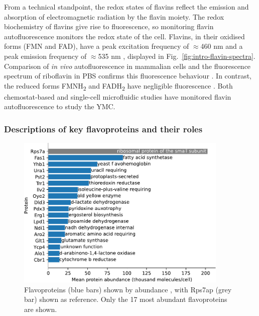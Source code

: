 From a technical standpoint, the redox states of flavins reflect the emission and absorption of electromagnetic radiation by the flavin moiety.
The redox biochemistry of flavins give rise to fluorescence, so monitoring flavin autofluorescence monitors the redox state of the cell.
Flavins, in their oxidised forms (FMN and FAD), have a peak excitation frequency of $\approx$460 nm and a peak emission frequency of $\approx$535 nm \parencite{maslankaAutofluorescenceYeastSaccharomyces2018, wagnieresVivoFluorescenceSpectroscopy1998}, displayed in Fig.\ \ref{fig:intro-flavin-spectra}.
Comparison of \textit{in vivo} autofluorescence in mammalian cells and the fluorescence spectrum of riboflavin in PBS confirms this fluorescence behaviour \parencite{aubinAutofluorescenceViableCultured1979}.
In contrast, the reduced forms FMNH\textsubscript{2} and FADH\textsubscript{2} have negligible fluorescence \parencite{mastersConfocalRedoxImaging1994}.
Both chemostat-based \parencite{sasidharanTimeStructureYeastMetabolism2012, murrayRedoxRegulationRespiring2011} and single-cell microfluidic studies \parencite{baumgartnerFlavinbasedMetabolicCycles2018} have monitored flavin autofluorescence to study the YMC\@.

\subsubsection{Descriptions of key flavoproteins and their roles}
\label{subsubsec:intro-flavin-biochem-descriptions}

\begin{figure}
  \centering
  \includegraphics[width=0.9\textwidth]{flavoprotein_abundance_bar}
  \caption[
    Flavoproteins shown by abundance
  ]{
    Flavoproteins (blue bars) shown by abundance \parencite{hoUnificationProteinAbundance2018}, with Rps7ap (grey bar) shown as reference.
    Only the 17 most abundant flavoproteins are shown.
    }
  \label{fig:intro-flavoprotein-abundance}
\end{figure}

